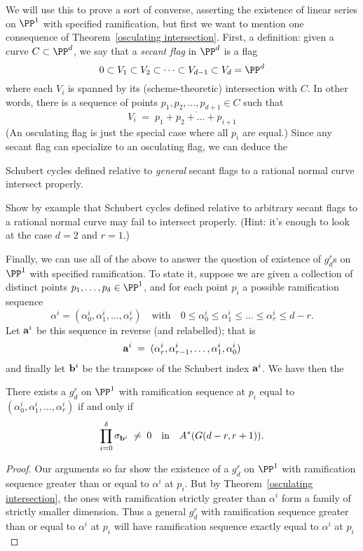 We will use this to prove a sort of converse, asserting the existence of linear series on $\PP^1$ with specified ramification, but first we want to mention one consequence of Theorem~\ref{osculating intersection}. First, a definition: given a curve $C \subset \PP^d$, we say that a \emph{secant flag} in $\PP^d$ is a flag
$$
0 \subset V_1 \subset V_2 \subset \dots \subset V_{d-1} \subset V_d = \PP^d
$$
where each $V_i$ is spanned by its (scheme-theoretic) intersection with $C$. In other words, there is a sequence of points $p_1, p_2, \dots, p_{d+1} \in C$ such that
$$
V_i \; = \; \overline{p_1+p_2+ \dots + p_{i+1}}
$$
(An osculating flag is just the special case where all $p_i$ are equal.) Since any secant flag can specialize to an osculating flag, we can deduce the

\begin{corollary}\label{secant schubert proper}
Schubert cycles defined relative to \emph{general} secant flags to a rational normal curve intersect properly.
\end{corollary} 

\begin{exercise}
Show by example that Schubert cycles defined relative to arbitrary secant flags to a rational normal curve may fail to intersect properly. (Hint: it's enough to look at the case $d=2$ and $r=1$.)
\end{exercise}

Finally, we can use all of the above to answer the question of existence of $g^r_d$s on $\PP^1$ with specified ramification. To state it, suppose we are given a collection of distinct points $p_1,\dots,p_\delta \in \PP^1$, and for each point $p_i$ a possible ramification sequence
$$
\alpha^i = (\alpha^i_0, \alpha^i_1, \dots, \alpha^i_r) \quad \text{with} \quad 0 \leq \alpha^i_0 \leq \alpha^i_1 \leq \dots \leq \alpha^i_r \leq d-r.
$$
Let ${\bf a}^i$ be this sequence in reverse (and relabelled); that is
$$
{\bf a}^i \; = \; (\alpha^i_r, \alpha^i_{r-1}, \dots, \alpha^i_1, \alpha^i_0)
$$
and finally let ${\bf b}^i$ be the transpose of the Schubert index ${\bf a}^i$. We have then the

\begin{theorem}
There exists a $g^r_d$ on $\PP^1$ with ramification sequence at $p_i$ equal to $(\alpha^i_0, \alpha^i_1, \dots, \alpha^i_r)$ if and only if 
$$
\prod_{i=0}^\delta  \sigma_{{\bf b}^i} \; \neq \; 0 \quad \text{in} \quad A^*(G(d-r, r+1)).
$$
\end{theorem}

\begin{proof}
Our arguments so far show the existence of a $g^r_d$ on $\PP^1$ with ramification sequence greater than or equal to $\alpha^i$ at $p_i$. But by Theorem~\ref{osculating intersection}, the ones with ramification strictly greater than $\alpha^i$ form a family of strictly smaller dimension. Thus a general $g^r_d$ with ramification sequence greater than or equal to $\alpha^i$ at $p_i$ will have  ramification sequence exactly equal to $\alpha^i$ at $p_i$
\end{proof}


